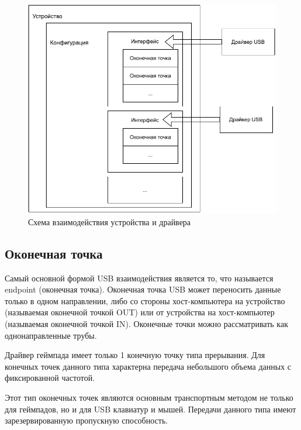 \begin{figure}[h!]
	\centering
	\includegraphics[scale=0.9]{img/Usb-device.pdf}
	\caption{Схема взаимодействия устройства и драйвера}
	\label{USB-device}
\end{figure}\par

\subsection{Оконечная точка}
Самый основной формой USB взаимодействия является то, что называется endpoint
(оконечная точка). Оконечная точка USB может переносить данные только в одном
направлении, либо со стороны хост-компьютера на устройство (называемая оконечной точкой
OUT) или от устройства на хост-компьютер (называемая оконечной точкой IN). Оконечные
точки можно рассматривать как однонаправленные трубы.\par
Драйвер геймпада имеет только 1 конечную точку типа прерывания. Для
конечных точек данного типа характерна передача небольшого объема данных
с фиксированной частотой.\par Этот тип оконечных точек являются основным транспортным методом не только для
геймпадов, но и для USB клавиатур и мышей.
Передачи данного типа имеют зарезервированную пропускную способность. 

